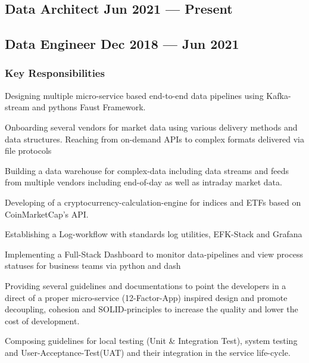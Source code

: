 \documentclass[letter,10pt]{article}
\begin{document}
\subsection{{Data Architect \hfill Jun 2021 --- Present}}
\subsection{{Data Engineer \hfill Dec 2018 --- Jun 2021}}

\subsubsection*{{Key Responsibilities}}

\begin{zitemize}



	\item Designing multiple micro-service based end-to-end data pipelines using Kafka-stream and pythons Faust Framework.
	
	\item Onboarding several vendors for market data using various delivery methods and data structures. Reaching from on-demand APIs to complex formats delivered via file protocols

	\item Building a data warehouse for complex-data including data streams and feeds from multiple vendors including end-of-day as well as intraday market data. 

	\item Developing of a cryptocurrency-calculation-engine for indices and ETFs based on CoinMarketCap's API.
	
	\item Establishing a Log-workflow with standards log utilities, EFK-Stack and Grafana
	
	\item Implementing a Full-Stack Dashboard to monitor data-pipelines and view process statuses for business teams via python and dash
	
	\item Providing several guidelines and documentations to point the developers in a direct of a proper micro-service (12-Factor-App) inspired design and promote decoupling, cohesion and SOLID-principles to increase the quality and lower the cost of development. 
	
	
	\item  Composing guidelines for local testing (Unit \& Integration Test), system testing and User-Acceptance-Test(UAT) and their integration in the service life-cycle.
	

\end{zitemize}
\end{document}
